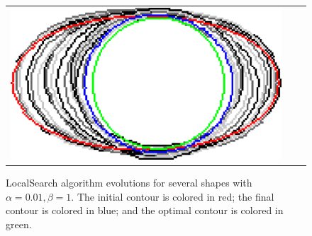 \begin{figure}[hp!]
\begin{tabular}{ccc}
	\includegraphics[scale=0.25]{figures/chapter5/flow/ellipse/radius_5/ii/elastica/len_pen_0.01000/jonctions_1/curve_segs_4/best/gs_0.25000/summary.pdf}				
\end{tabular}
		\caption{LocalSearch algorithm evolutions for several shapes with $\alpha=0.01,\beta=1$. The initial contour is colored in red; the final contour is colored in blue; and the optimal contour is colored in green.}	
		\label{fig:local-comb-ii5-results}
\end{figure}

